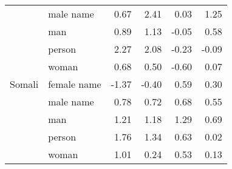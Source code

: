 \begin{tabular}{llrrrr}
       & male name &         0.67 &                 2.41 &              0.03 &                      1.25 \\
       & man &         0.89 &                 1.13 &             -0.05 &                      0.58 \\
       & person &         2.27 &                 2.08 &             -0.23 &                     -0.09 \\
       & woman &         0.68 &                 0.50 &             -0.60 &                      0.07 \\
Somali & female name &        -1.37 &                -0.40 &              0.59 &                      0.30 \\
       & male name &         0.78 &                 0.72 &              0.68 &                      0.55 \\
       & man &         1.21 &                 1.18 &              1.29 &                      0.69 \\
       & person &         1.76 &                 1.34 &              0.63 &                      0.02 \\
       & woman &         1.01 &                 0.24 &              0.53 &                      0.13 \\
\bottomrule
\end{tabular}

